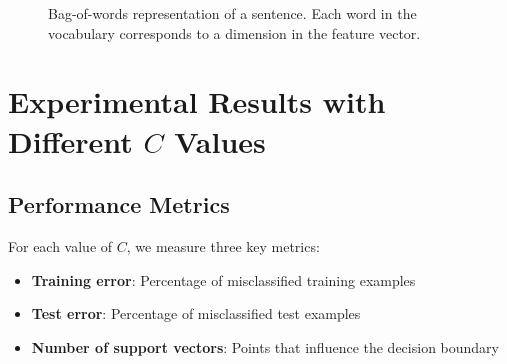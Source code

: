 \documentclass{article}
\begin{document}
\begin{figure}[h]
\centering
{}
\caption{Bag-of-words representation of a sentence. Each word in the vocabulary corresponds to a dimension in the feature vector.}
\end{figure}

\section{Experimental Results with Different $C$ Values}

\subsection{Performance Metrics}
For each value of $C$, we measure three key metrics:

\begin{itemize}
    \item \textbf{Training error}: Percentage of misclassified training examples
    \item \textbf{Test error}: Percentage of misclassified test examples
    \item \textbf{Number of support vectors}: Points that influence the decision boundary
\end{itemize}
\end{document}
